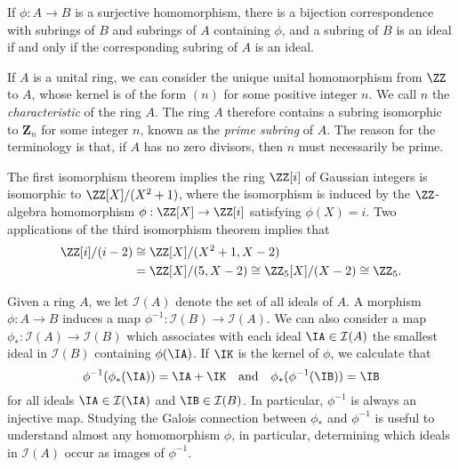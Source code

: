 \begin{theorem}
    If $\phi:A \to B$ is a surjective homomorphism, there is a bijection correspondence with subrings of $B$ and subrings of $A$ containing $\phi$, and a subring of $B$ is an ideal if and only if the corresponding subring of $A$ is an ideal.
\end{theorem}

\begin{example}
    If $A$ is a unital ring, we can consider the unique unital homomorphism from $\ZZ$ to $A$, whose kernel is of the form $(n)$ for some positive integer $n$. We call $n$ the \emph{characteristic} of the ring $A$. The ring $A$ therefore contains a subring isomorphic to $\mathbf{Z}_n$ for some integer $n$, known as the \emph{prime subring} of $A$. The reason for the terminology is that, if $A$ has no zero divisors, then $n$ must necessarily be prime.
\end{example}

\begin{example}
    The first isomorphism theorem implies the ring $\ZZ[i]$ of Gaussian integers is isomorphic to $\ZZ[X] / (X^2 + 1)$, where the isomorphism is induced by the $\ZZ$-algebra homomorphism $\phi: \ZZ[X] \to \ZZ[i]$ satisfying $\phi(X) = i$. Two applications of the third isomorphism theorem implies that
    \begin{align*}
        \ZZ[i]/(i-2) &\cong \ZZ[X]/(X^2 + 1, X - 2)\\
        &= \ZZ[X]/(5, X - 2) \cong \ZZ_5[X]/(X - 2) \cong \ZZ_5.
    \end{align*}
\end{example}

Given a ring $A$, we let $\mathcal{I}(A)$ denote the set of all ideals of $A$. A morphism $\phi: A \to B$ induces a map $\phi^{-1}: \mathcal{I}(B) \to \mathcal{I}(A)$. We can also consider a map $\phi_*: \mathcal{I}(A) \to \mathcal{I}(B)$ which associates with each ideal $\IA \in \mathcal{I}(A)$ the smallest ideal in $\mathcal{I}(B)$ containing $\phi(\IA)$. If $\IK$ is the kernel of $\phi$, we calculate that
%
\[ \phi^{-1}(\phi_*(\IA)) = \IA + \IK \quad\text{and}\quad \phi_*(\phi^{-1}(\IB)) = \IB  \]
%
for all ideals $\IA \in \mathcal{I}(\IA)$ and $\IB \in \mathcal{I}(B)$. In particular, $\phi^{-1}$ is always an injective map. Studying the Galois connection between $\phi_*$ and $\phi^{-1}$ is useful to understand almost any homomorphism $\phi$, in particular, determining which ideals in $\mathcal{I}(A)$ occur as images of $\phi^{-1}$.

